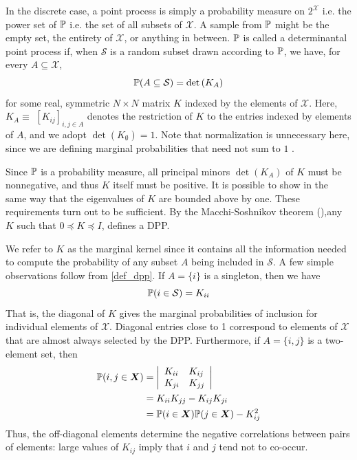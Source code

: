 In the discrete case, a point process is simply a probability measure on $2^{\mathcal X}$ i.e. the power set of $\mathbb{P}$ i.e. the set of all subsets of $\mathcal{X}$. A sample from $\mathbb{P}$ might be the empty set, the entirety of $\mathcal{X}$, or anything in between. $\mathbb{P}$ is called a determinantal point process if, when $\mathcal{S}$ is a random subset drawn according to $\mathbb{P}$, we have, for every $A \subseteq \mathcal{X}$,
\begin{equation}
	\mathbb{P}(A \subseteq \mathcal{S})=\operatorname{det}\left(K_A\right)
    \label{def_dpp}
\end{equation}
for some real, symmetric $N \times N$ matrix $K$ indexed by the elements of $\mathcal{X}$. Here, $K_A \equiv$ $\left[K_{i j}\right]_{i, j \in A}$ denotes the restriction of $K$ to the entries indexed by elements of $A$, and we adopt $\operatorname{det}\left(K_\emptyset\right)=1$. Note that normalization is unnecessary here, since we are defining marginal probabilities that need not sum to $1$ .

Since $\mathbb{P}$ is a probability measure, all principal minors $\operatorname{det}\left(K_A\right)$ of $K$ must be nonnegative, and thus $K$ itself must be positive. It is possible to show in the same way that the eigenvalues of $K$ are bounded above by one. These requirements turn out to be sufficient. By the Macchi-Soshnikov theorem (\cite{macchi1975dpp}),any $K$ such that $0 \preceq K \preceq I$, defines a DPP.

We refer to $K$ as the marginal kernel since it contains all the information needed to compute the probability of any subset $A$ being included in $\mathcal{S}$. A few simple observations follow from \ref{def_dpp}. If $A=\{i\}$ is a singleton, then we have
\begin{equation*}
	\mathbb{P}(i \in \mathcal{S})=K_{i i}
\end{equation*}
That is, the diagonal of $K$ gives the marginal probabilities of inclusion for individual elements of $\mathcal{X}$. Diagonal entries close to 1 correspond to elements of $\mathcal{X}$ that are almost always selected by the DPP. Furthermore, if $A=\{i, j\}$ is a two-element set, then
\begin{equation}
	\begin{aligned}
        \mathbb{P}(i, j \in \boldsymbol{X}) &=\left|\begin{array}{ll}
	K_{i i} & K_{i j} \\
	K_{j i} & K_{j j}
	\end{array}\right| \\
	&=K_{i i} K_{j j}-K_{i j} K_{j i} \\
	&=\mathbb{P}(i \in \boldsymbol{X}) \mathbb{P}(j \in \boldsymbol{X})-K_{i j}^2
	\end{aligned}
    \label{eqn_paircorrel}
\end{equation}
Thus, the off-diagonal elements determine the negative correlations between pairs of elements: large values of $K_{i j}$ imply that $i$ and $j$ tend not to co-occur.

